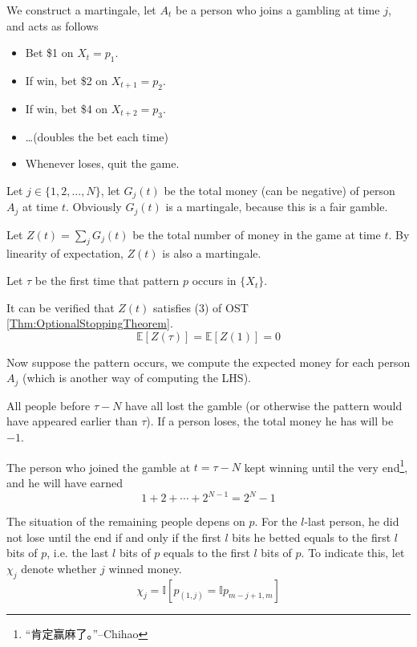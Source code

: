             We construct a martingale, let $A_t$ be a person who joins a gambling at time $j$, and acts as follows
            \begin{itemize}
                \item Bet \$1 on $X_t=p_1$.
                \item If win, bet \$2 on $X_{t+1}=p_2$.
                \item If win, bet \$4 on $X_{t+2}=p_3$.
                \item \dots (doubles the bet each time)
                \item Whenever loses, quit the game.
            \end{itemize}

            Let $j \in \{1, 2, \dots, N\}$, let $G_j(t)$ be the total money (can be negative) of person $A_j$ at time $t$. Obviously $G_j(t)$ is a martingale, because this is a fair gamble.

            Let $Z(t) = \sum_j G_j(t)$ be the total number of money in the game at time $t$. By linearity of expectation, $Z(t)$ is also a martingale.

            Let $\tau$ be the first time that pattern $p$ occurs in $\{X_t\}$.

            It can be verified that $Z(t)$ satisfies (3) of OST \ref{Thm:OptionalStoppingTheorem}.
            \[ \mathbb{E}[Z(\tau)] = \mathbb{E}[Z(1)] = 0 \]

            Now suppose the pattern occurs, we compute the expected money for each person $A_j$ (which is another way of computing the LHS).

            All people before $\tau - N$ have all lost the gamble (or otherwise the pattern would have appeared earlier than $\tau$). If a person loses, the total money he has will be $-1$. 

            The person who joined the gamble at $t = \tau-N$ kept winning until the very end\footnote{“肯定赢麻了。”--Chihao}, and he will have earned
            \[ 1 + 2 + \cdots + 2^{N-1} = 2^N-1 \]

            The situation of the remaining people depens on $p$. For the $l$-last person, he did not lose until the end if and only if the first $l$ bits he betted equals to the first $l$ bits of $p$, i.e. the last $l$ bits of $p$ equals to the first $l$ bits of $p$. To indicate this, let $\chi_j$ denote whether $j$ winned money.
            \[ \chi_j = \mathbb{I}[p_{(1,j)} = \mathbb{I}p_{m-j+1,m}] \]

